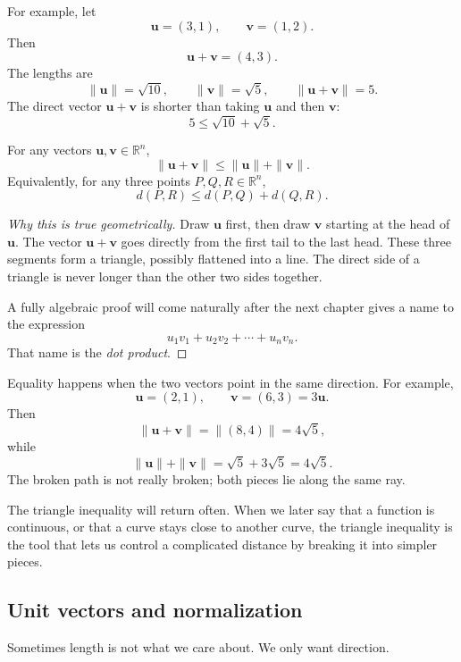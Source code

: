 For example, let
\[
    \mathbf u=(3,1),\qquad \mathbf v=(1,2).
\]
Then
\[
    \mathbf u+\mathbf v=(4,3).
\]
The lengths are
\[
    \|\mathbf u\|=\sqrt{10},\qquad
    \|\mathbf v\|=\sqrt{5},\qquad
    \|\mathbf u+\mathbf v\|=5.
\]
The direct vector \(\mathbf u+\mathbf v\) is shorter than taking \(\mathbf u\) and then
\(\mathbf v\):
\[
    5
    \leq
    \sqrt{10}+\sqrt{5}.
\]

\begin{theorem}
For any vectors \(\mathbf u,\mathbf v\in\mathbb R^n\),
\[
    \|\mathbf u+\mathbf v\|
    \leq
    \|\mathbf u\|+\|\mathbf v\|.
\]
Equivalently, for any three points \(P,Q,R\in\mathbb R^n\),
\[
    d(P,R)\leq d(P,Q)+d(Q,R).
\]
\end{theorem}

\begin{proof}[Why this is true geometrically]
Draw \(\mathbf u\) first, then draw \(\mathbf v\) starting at the head of \(\mathbf u\).
The vector \(\mathbf u+\mathbf v\) goes directly from the first tail to the last head.
These three segments form a triangle, possibly flattened into a line.  The direct side
of a triangle is never longer than the other two sides together.

A fully algebraic proof will come naturally after the next chapter gives a name to the
expression
\[
    u_1v_1+u_2v_2+\cdots+u_nv_n.
\]
That name is the \emph{dot product}.
\end{proof}

Equality happens when the two vectors point in the same direction.  For example,
\[
    \mathbf u=(2,1),\qquad \mathbf v=(6,3)=3\mathbf u.
\]
Then
\[
    \|\mathbf u+\mathbf v\|
    =
    \|(8,4)\|
    =
    4\sqrt{5},
\]
while
\[
    \|\mathbf u\|+\|\mathbf v\|
    =
    \sqrt5+3\sqrt5
    =
    4\sqrt5.
\]
The broken path is not really broken; both pieces lie along the same ray.

The triangle inequality will return often.  When we later say that a function is
continuous, or that a curve stays close to another curve, the triangle inequality is the
tool that lets us control a complicated distance by breaking it into simpler pieces.

\subsection{Unit vectors and normalization}

Sometimes length is not what we care about.  We only want direction.

